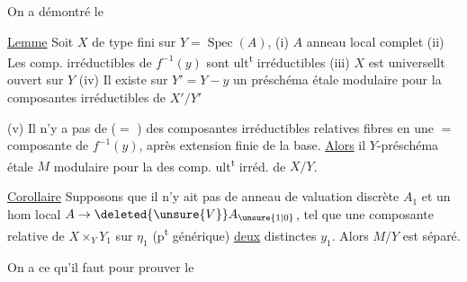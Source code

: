 On a démontré le

\uline{Lemme} Soit $X$ de type fini sur $Y=\operatorname{Spec}(A)$, (i) $A$ anneau local complet (ii)  Les comp. irréductibles de $f^{-1}(y)$ sont ult\textsuperscript{t} irréductibles (iii) $X$ est universellt ouvert sur $Y$ (iv)  Il existe sur $Y'=Y-y$ un préschéma étale  modulaire pour la   composantes  irréductibles de $X'/Y'$

(v) Il n'y a pas de  ($=$ ) des composantes irréductibles relatives  fibres en une $=$ composante de $f^{-1}(y)$, après  extension finie de la base. \uline{Alors} il   $Y$-préschéma  étale $M$ modulaire pour la  des comp. ult\textsuperscript{t} irréd. de $X/Y$.

\uline{Corollaire}  Supposons que il n'y ait pas de \unsure{!}  anneau de valuation discrète $A_1$ et un hom local $A\to\deleted{\unsure{V}}A_{\unsure{1|0}}$, tel que une composante relative de $X\times_Y Y_1$ sur $\eta_1$ (p\textsuperscript{t} générique)   \uline{deux} distinctes  $y_1$. Alors $M/Y$ est séparé.

On a   ce qu'il faut pour prouver le
